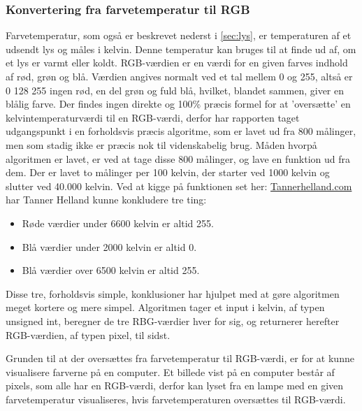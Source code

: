 \subsubsection{Konvertering fra farvetemperatur til RGB}
\label{sec:temptilrgb}
Farvetemperatur, som også er beskrevet nederst i \ref{sec:lys}, er temperaturen af et udsendt lys og måles i kelvin. Denne temperatur kan bruges til at finde ud af, om et lys er varmt eller koldt. 
RGB-værdien er en værdi for en given farves indhold af rød, grøn og blå. Værdien angives normalt ved et tal mellem 0 og 255, altså er 0 128 255 ingen rød, en del grøn og fuld blå, hvilket, blandet sammen, giver en blålig farve.
Der findes ingen direkte og 100\% præcis formel for at ’oversætte’ en kelvintemperaturværdi til en RGB-værdi, derfor har rapporten taget udgangspunkt i en forholdsvis præcis algoritme, som er lavet ud fra 800 målinger, men som stadig ikke er præcis nok til videnskabelig brug.
Måden hvorpå algoritmen er lavet, er ved at tage disse 800 målinger, og lave en funktion ud fra dem. Der er lavet to målinger per 100 kelvin, der starter ved 1000 kelvin og slutter ved 40.000 kelvin. Ved at kigge på funktionen set her: \href{http://www.tannerhelland.com/4435/convert-temperature-rgb-algorithm-code/raw_temperature_vs_rgb_chart/} {Tannerhelland.com} har Tanner Helland kunne konkludere  tre ting:

\begin{itemize}
\item Røde værdier under 6600 kelvin er altid 255.
\item Blå værdier under 2000 kelvin er altid 0.
\item Blå værdier over 6500 kelvin er altid 255.
\end{itemize}

Disse tre, forholdsvis simple, konklusioner har hjulpet med at gøre algoritmen meget kortere og mere simpel. Algoritmen tager et input i kelvin, af typen unsigned int, beregner de tre RBG-værdier hver for sig, og returnerer herefter RGB-værdien, af typen pixel, til sidst. 

Grunden til at der oversættes fra farvetemperatur til RGB-værdi, er for at kunne visualisere farverne på en computer. Et billede vist på en computer består af pixels, som alle har en RGB-værdi, derfor kan lyset fra en lampe med en given farvetemperatur visualiseres, hvis farvetemperaturen oversættes til RGB-værdi.